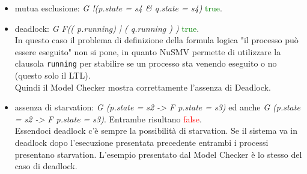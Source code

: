 \documentclass[a4paper]{article}
\begin{document}
\begin{itemize}
        \item mutua esclusione: \textit{G !(p.state = s4 \& q.state = s4)} \textcolor{green}{true}.\\
        \item deadlock: \textit{G F(( p.running) | ( q.running ) )} \textcolor{green}{true}. \\
		In questo caso il problema di definizione della formula logica "il processo può essere eseguito" non si pone, in quanto NuSMV permette di utilizzare la clausola \texttt{running} per stabilire se un processo sta venendo eseguito o no (questo solo il LTL).\\
		Quindi il Model Checker mostra correttamente l'assenza di Deadlock.
        \item assenza di starvation: \textit{G (p.state = s2 ->  F p.state = s3)} ed anche \textit{G (p.state = s2 ->  F p.state = s3)}. Entrambe risultano \textcolor{red}{false}.\\
		Essendoci deadlock c'è sempre la possibilità di starvation. Se il sistema va in deadlock dopo l'esecuzione presentata precedente entrambi i processi presentano starvation.
		L'esempio presentato dal Model Checker è lo stesso del caso di deadlock.
\end{itemize}
\end{document}
